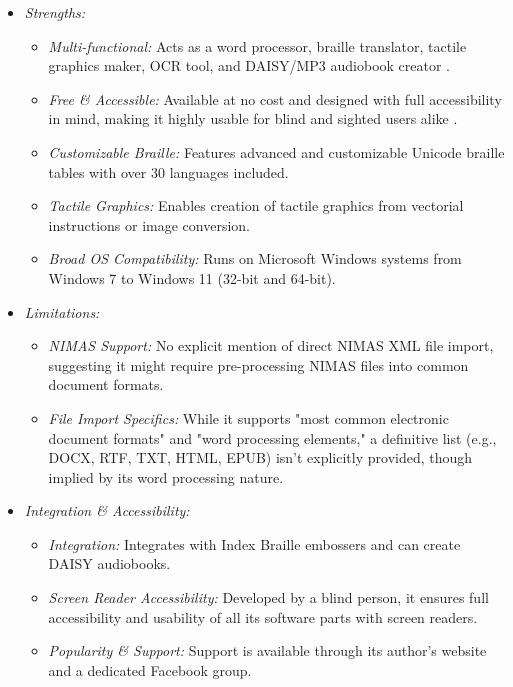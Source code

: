 \begin{itemize}
    \item \emph{Strengths:}
    \begin{itemize}
        \item \emph{Multi-functional:} Acts as a word processor, braille translator, tactile graphics maker, OCR tool, and DAISY/MP3 audiobook creator \cite{IndexBrailleBiblos}.
        \item \emph{Free \& Accessible:} Available at no cost and designed with full accessibility in mind, making it highly usable for blind and sighted users alike \cite{DigrandeBiblos}.
        \item \emph{Customizable Braille:} Features advanced and customizable Unicode braille tables with over 30 languages included.
        \item \emph{Tactile Graphics:} Enables creation of tactile graphics from vectorial instructions or image conversion.
        \item \emph{Broad OS Compatibility:} Runs on Microsoft Windows systems from Windows 7 to Windows 11 (32-bit and 64-bit).
    \end{itemize}
    \item \emph{Limitations:}
    \begin{itemize}
        \item \emph{NIMAS Support:} No explicit mention of direct NIMAS XML file import, suggesting it might require pre-processing NIMAS files into common document formats.
        \item \emph{File Import Specifics:} While it supports "most common electronic document formats" and "word processing elements," a definitive list (e.g., DOCX, RTF, TXT, HTML, EPUB) isn't explicitly provided, though implied by its word processing nature.
    \end{itemize}
    \item \emph{Integration \& Accessibility:}
    \begin{itemize}
        \item \emph{Integration:} Integrates with Index Braille embossers and can create DAISY audiobooks.
        \item \emph{Screen Reader Accessibility:} Developed by a blind person, it ensures full accessibility and usability of all its software parts with screen readers.
        \item \emph{Popularity \& Support:} Support is available through its author's website and a dedicated Facebook group.
    \end{itemize}
\end{itemize}

